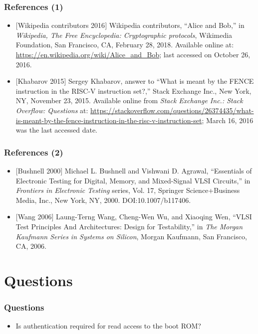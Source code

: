 \documentclass[xcolor={usenames,dvipsnames},hyperref={hyperindex,bookmarks}]{beamer}
\begin{document}
\frame
{
	\frametitle{References (1)}

	\begin{itemize}
	\item $[$Wikipedia contributors 2016$]$ Wikipedia contributors, ``Alice and Bob,'' in {\it Wikipedia, The Free Encyclopedia: Cryptographic protocols}, Wikimedia Foundation, San Francisco, CA, February 28, 2018. Available online at: \url{https://en.wikipedia.org/wiki/Alice_and_Bob}; last accessed on October 26, 2016.
	\item $[$Khabarov 2015$]$ Sergey Khabarov, answer to ``What is meant by the FENCE instruction in the RISC-V instruction set?,'' Stack Exchange Inc., New York, NY, November 23, 2015. Available online from {\it Stack Exchange Inc.: Stack Overflow: Questions} at: \url{https://stackoverflow.com/questions/26374435/what-is-meant-by-the-fence-instruction-in-the-risc-v-instruction-set}; March 16, 2016 was the last accessed date.
	\end{itemize}
}



\frame
{
	\frametitle{References (2)}

	\begin{itemize}
	\item $[$Bushnell 2000$]$ Michael L. Bushnell and Vishwani D. Agrawal, ``Essentials of Electronic Testing for Digital, Memory, and Mixed-Signal {VLSI} Circuits,'' in {\it Frontiers in Electronic Testing} series, Vol. 17, Springer Science+Business Media, {Inc.}, New York, NY, 2000. DOI:10.1007/b117406.
	\item $[$Wang 2006$]$ {Laung-Terng} Wang, {Cheng-Wen} Wu, and Xiaoqing Wen, ``{VLSI} Test Principles And Architectures: Design for Testability,'' in {\it The Morgan Kaufmann Series in Systems on Silicon}, Morgan Kaufmann, San Francisco, CA, 2006.
	\end{itemize}
}









\section{Questions}

\frame
{
	\frametitle{Questions}

	\begin{itemize}
	\item Is authentication required for read access to the boot ROM?
	\end{itemize}
}
\end{document}
